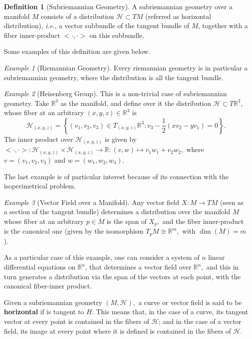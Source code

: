 \documentclass[12pt, letterpaper, reqno]{amsart}
\theoremstyle{definition}
\newtheorem{df}{Definition}
\theoremstyle{plain}
\theoremstyle{remark}
\newtheorem{ex}{Example}
\begin{document}
\begin{df}[Subriemannian Geometry]
	A subriemannian geometry over a manifold $ M $ consists of a distribution $ \mathcal{H}\subset TM $ (referred as horizontal distribution), \textit{i.e.}, a vector subbundle of the tangent bundle of $ M $, together with a fiber inner-product $ <\cdot,\cdot> $ on this subbundle. 
\end{df}

Some examples of this definition are given below.
\begin{ex}[Riemannian Geometry]\label{ex:riem_geo}
	Every riemannian geometry is in particular a subriemannian geometry, where the distribution is all the tangent bundle.
\end{ex}

\begin{ex}[Heisenberg Group]\label{ex:heis_group}
	This is a non-trivial case of subriemannian geometry. Take $ \mathbb{R} ^3 $ as the manifold, and define over it the distribution $ \mathcal{H}\subset T \mathbb{R} ^3 $, whose fiber at an arbitrary $ (x,y,z)\in \mathbb{R}^3  $ is   
	$$ \mathcal{H}_{(x,y,z)} = \left\{ (v_1,v_2,v_3)\in T_{(x,y,z)} \mathbb{R}^3 : v_3- \frac{1}{2} \left( xv_2-yv_1 \right)=0   \right\}. $$ 
	The inner product over $ \mathcal{H}_{(x,y,z)} $ is given by $<\cdot,\cdot>:  \mathcal{H}_{(x,y,z)}\times\mathcal{H}_{(x,y,z)} \rightarrow { \mathbb{R} }:(v,w)\mapsto v_1w_1+v_2w_2,$ where $ v=(v_1,v_2,v_3) $ and $ w=(w_1,w_2,w_3). $  

\end{ex}
	The last example is of particular interest because of its connection with the isoperimetrical problem.
\begin{ex}[Vector Field over a Manifold]\label{ex:vect_field}
	Any vector field $ X: M \rightarrow {TM} $ (seen as a section of the tangent bundle) determines a distribution over the manifold $ M $ whose fiber at an arbitrary $ p\in M $ is the span of $ X_p, $ and the fiber inner-product is the canonical one (given by the isomorphism $ T_pM\cong \mathbb{R} ^m, $ with $\operatorname{dim} \left( M \right) = m$).

	As a particular case of this example, one can consider a system of $ n $ linear differential equations on $ \mathbb{R}^n $, that determines a vector field over $ \mathbb{R}^n,  $ and this in turn generates a distribution via the span of the vectors at each point, with the canonical fiber-inner product.
\end{ex}

Given a subriemannian geometry $ (M, \mathcal{H}), $ a curve or vector field is said to be \textbf{horizontal} if is tangent to $ H $. This means that, in the case of a curve, its tangent vector at every point is contained in the fibers of $ \mathcal{H} $; and in the case of a vector field, its image at every point where it is defined is contained in the fibers of $ \mathcal{H} .$   
\end{document}
